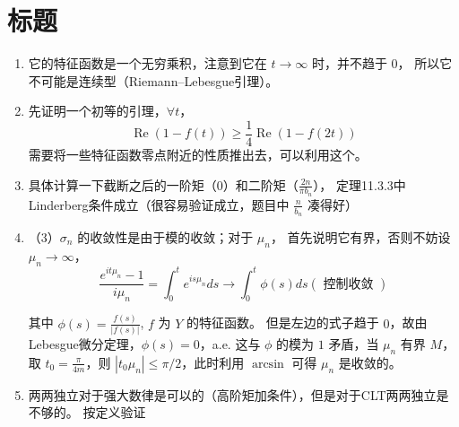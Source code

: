 \section{标题}
\begin{enumerate}
\item[14]
它的特征函数是一个无穷乘积，注意到它在 $t \rightarrow \infty$ 时，并不趋于 $0$，
所以它不可能是连续型（Riemann--Lebesgue引理）。

\item[25]
先证明一个初等的引理，$\forall t$，
$$\operatorname{Re}(1-f(t)) \geq \frac{1}{4} \operatorname{Re}(1-f(2 t))$$
需要将一些特征函数零点附近的性质推出去，可以利用这个。

\item[32]
具体计算一下截断之后的一阶矩（$0$）和二阶矩（$\frac{2 n}{\pi b_{n}}$），
定理11.3.3中Linderberg条件成立（很容易验证成立，题目中 $\frac{n}{b_{n}}$ 凑得好）

\item[31]
（3）$\sigma_{n}$ 的收敛性是由于模的收敛；对于 $\mu_{n}$，
首先说明它有界，否则不妨设 $\mu_{n} \rightarrow \infty$，
$$\frac{e^{i t \mu_{n}}-1}{i \mu_{n}}=\int_{0}^{t} e^{i s \mu_{n}} d s \rightarrow \int_{0}^{t} \phi(s) d s(\text { 控制收敛 })$$

其中 $\phi(s)=\frac{f(s)}{|f(s)|}$, $f$ 为 $Y$ 的特征函数。
但是左边的式子趋于 $0$，故由Lebesgue微分定理，$\phi(s)=0$，a.e. 这与 $\phi$ 的模为 $1$ 矛盾，当 $\mu_{n}$ 有界 $M$，取 $t_{0}=\frac{\pi}{4 m}$，则 $\left|t_{0} \mu_{n}\right| \leq \pi / 2$，此时利用 $\arcsin$ 可得 $\mu_{n}$ 是收敛的。

\item[33]
两两独立对于强大数律是可以的（高阶矩加条件），但是对于CLT两两独立是不够的。
按定义验证
\end{enumerate}